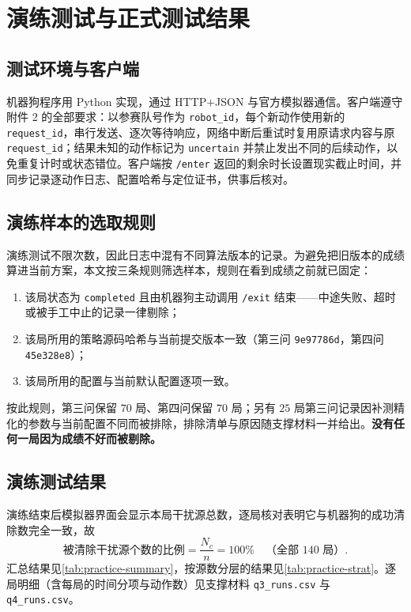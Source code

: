 \section{演练测试与正式测试结果}\label{sec:results}

\subsection{测试环境与客户端}

机器狗程序用 Python 实现，通过 HTTP$+$JSON 与官方模拟器通信。客户端遵守附件 2 的全部要求：以参赛队号作为 \texttt{robot\_id}，每个新动作使用新的 \texttt{request\_id}，串行发送、逐次等待响应，网络中断后重试时复用原请求内容与原 \texttt{request\_id}；结果未知的动作标记为 \texttt{uncertain} 并禁止发出不同的后续动作，以免重复计时或状态错位。客户端按 \texttt{/enter} 返回的剩余时长设置现实截止时间，并同步记录逐动作日志、配置哈希与定位证书，供事后核对。

\subsection{演练样本的选取规则}

演练测试不限次数，因此日志中混有不同算法版本的记录。为避免把旧版本的成绩算进当前方案，本文按三条规则筛选样本，规则在看到成绩之前就已固定：

\begin{enumerate}[label=(\arabic*),itemsep=1pt]
  \item 该局状态为 \texttt{completed} 且由机器狗主动调用 \texttt{/exit} 结束——中途失败、超时或被手工中止的记录一律剔除；
  \item 该局所用的策略源码哈希与当前提交版本一致（第三问 \texttt{9e97786d}，第四问 \texttt{45e328e8}）；
  \item 该局所用的配置与当前默认配置逐项一致。
\end{enumerate}

按此规则，第三问保留 $70$ 局、第四问保留 $70$ 局；另有 $25$ 局第三问记录因补测精化的参数与当前配置不同而被排除，排除清单与原因随支撑材料一并给出。\textbf{没有任何一局因为成绩不好而被剔除。}

\subsection{演练测试结果}

演练结束后模拟器界面会显示本局干扰源总数，逐局核对表明它与机器狗的成功清除数完全一致，故
\begin{equation}
  \text{被清除干扰源个数的比例}=\frac{N_c}{n}=100\%\quad\text{（全部 }140\text{ 局）} .
\end{equation}
汇总结果见\cref{tab:practice-summary}，按源数分层的结果见\cref{tab:practice-strat}。逐局明细（含每局的时间分项与动作数）见支撑材料 \texttt{q3\_runs.csv} 与 \texttt{q4\_runs.csv}。

